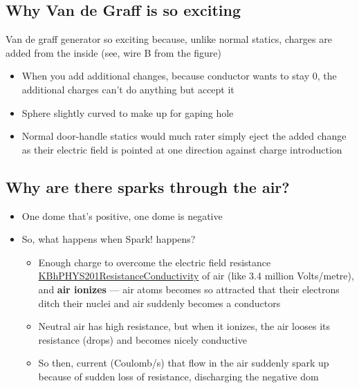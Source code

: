 \documentclass[letterpaper]{article}
\begin{document}
\subsection{Why Van de Graff is so exciting}
\label{sec:orgfd5694c}
Van de graff generator so exciting because, unlike normal statics,
charges are added from the inside (see, wire B from the figure)

\begin{itemize}
\item When you add additional changes, because conductor wants to stay 0,
the additional charges can't do anything but accept it
\item Sphere slightly curved to make up for gaping hole
\item Normal door-handle statics would much rater simply eject the added
change as their electric field is pointed at one direction against
charge introduction
\end{itemize}

\subsection{Why are there sparks through the air?}
\label{sec:orgf393646}
\begin{itemize}
\item One dome that's positive, one dome is negative
\item So, what happens when Spark! happens?

\begin{itemize}
\item Enough charge to overcome the electric field resistance
\href{KBhPHYS201ResistanceConductivity.org}{KBhPHYS201ResistanceConductivity}
of air (like 3.4 million Volts/metre), and \textbf{air ionizes} --- air
atoms becomes so attracted that their electrons ditch their nuclei
and air suddenly becomes a conductors
\item Neutral air has high resistance, but when it ionizes, the air looses
its resistance (drops) and becomes nicely conductive
\item So then, current (Coulomb/s) that flow in the air suddenly spark up
because of sudden loss of resistance, discharging the negative dom
\end{itemize}
\end{itemize}
\end{document}
